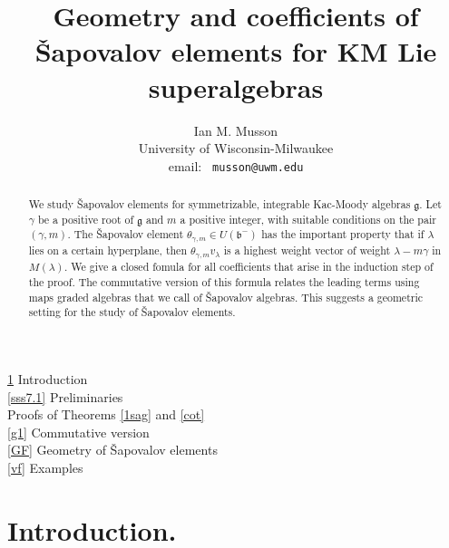 \documentclass{article}
\newcommand{\noi}{\noindent}
\newcommand{\gc}{\gamma}
\newcommand{\gl}{\lambda}
\newcommand{\fg}{\mathfrak{g}}\newcommand{\fgl}{\mathfrak{gl}}\newcommand{\so}{\mathfrak{so}}
\newcommand{\fb}{\mathfrak{b}}
\begin{document}
\title{Geometry and coefficients of Šapovalov elements for KM  Lie superalgebras}
\author{Ian M. Musson\\%
University of Wisconsin-Milwaukee\\ email: {\tt
musson@uwm.edu}}


\maketitle 

\begin{abstract} 
We study \v Sapovalov   elements for symmetrizable, integrable Kac-Moody 
algebras $\fg$. 
Let  $\gc$ be a positive  root of $\fg$ and $m$ a positive integer, with suitable conditions on the pair   $(\gc, m).$ The \v Sapovalov element
$\theta_{\gamma,m}\in U(\fb^-)	$
has the important property that if $\gl$ lies on a certain hyperplane, then
$\theta_{\gc, m} v_\lambda$ is a highest weight vector of weight $\lambda -m\gc$ in
$M(\gl)$. We give  a closed fomula for all coefficients that arise in the induction step of the 
proof. The commutative version  of this formula relates the leading terms  using maps graded  algebras that we call of \v Sapovalov   algebras. This suggests  a  geometric setting  for the study of 
\v Sapovalov elements. %
\end{abstract}
\noi \ref{uv.1}  {Introduction}%
\\ 
 \noi  \ref{sss7.1}  {Preliminaries} \\
\noi{\ref{PA.2} {Main results on coefficients}\\
\noi \ref{1s.5}} {Proofs of Theorems   \ref{1sag} and  \ref{cot}}\\
\noi \ref{g1} {Commutative version}\\ 
\noi  \ref{GF} {Geometry of Šapovalov elements} \\ 
\noi \ref{vf} Examples



\section{Introduction.} \label{uv.1} %
\end{document}

